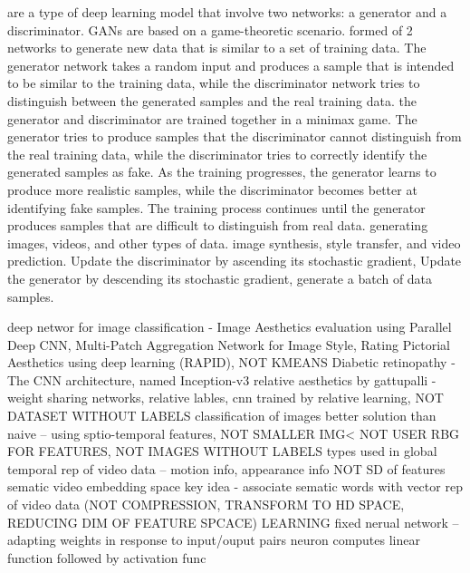 \documentclass[10pt]{article}
\begin{document}
\smallbreak
{} are a type of deep learning model that involve two networks: a generator and a discriminator. GANs are based on a game-theoretic scenario. formed of 2 networks
\NEW   [goal] to generate new data that is similar to a set of training data. The generator network takes a random input and produces a sample that is intended to be similar to the training data, while the discriminator network tries to distinguish between the generated samples and the real training data.
\NEW   [training] the generator and discriminator are trained together in a minimax game. The generator tries to produce samples that the discriminator cannot distinguish from the real training data, while the discriminator tries to correctly identify the generated samples as fake. As the training progresses, the generator learns to produce more realistic samples, while the discriminator becomes better at identifying fake samples. The training process continues until the generator produces samples that are difficult to distinguish from real data.
\NEW   [applications] generating images, videos, and other types of data. image synthesis, style transfer, and video prediction.
 Update the discriminator by ascending its stochastic gradient, Update the generator by descending its stochastic gradient, generate a batch of data samples.



\smallbreak
\NEW deep networ for image classification - Image Aesthetics evaluation using Parallel Deep CNN,  Multi-Patch Aggregation Network for Image Style, Rating Pictorial Aesthetics using deep learning (RAPID), NOT KMEANS
\NEW Diabetic retinopathy -  The CNN architecture, named Inception-v3
\NEW relative aesthetics by gattupalli - weight sharing networks, relative lables, cnn trained by relative learning, NOT DATASET WITHOUT LABELS
\NEW classification of images better solution than naive -- using sptio-temporal features, NOT SMALLER IMG< NOT USER RBG FOR FEATURES, NOT IMAGES WITHOUT LABELS
\NEW types used in global temporal rep of video data -- motion info, appearance info NOT SD of features
\NEW sematic video embedding space key idea - associate sematic words with vector rep of video data (NOT COMPRESSION, TRANSFORM TO HD SPACE, REDUCING DIM OF FEATURE SPCACE)
\NEW LEARNING fixed nerual network -- adapting weights in response to input/ouput pairs
\NEW neuron computes linear function followed by activation func
\end{document}
